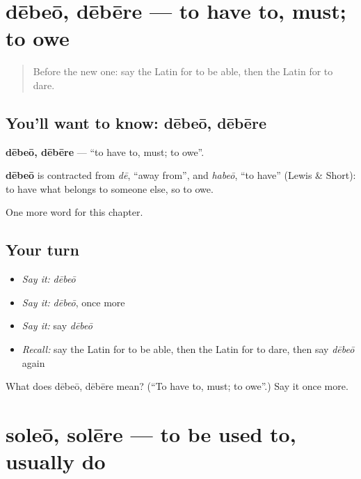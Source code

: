 \section[dēbeō, dēbēre]{dēbeō, dēbēre — to have to, must; to owe}

\label{lesson:LA-C109-debeo}



\begin{quote}
Before the new one: say the Latin for to be able, then the Latin for to dare.
\end{quote}

\subsection*{You'll want to know: dēbeō, dēbēre}
\textbf{dēbeō, dēbēre} — \textquotedblleft{}to have to, must; to owe\textquotedblright{}.

\begin{cousinweb}
\textbf{dēbeō} is contracted from \emph{dē}, \textquotedblleft{}away from\textquotedblright{}, and \emph{habeō}, \textquotedblleft{}to have\textquotedblright{} (Lewis \& Short): to have what belongs to someone else, so to owe.
\end{cousinweb}

\begin{grammarlens}[title={What you've built}]
One more word for this chapter.
\end{grammarlens}

\subsection*{Your turn}
\begin{itemize}
\raggedright
  \item \emph{Say it:} \emph{dēbeō}
  \item \emph{Say it:} \emph{dēbeō}, once more
  \item \emph{Say it:} say \emph{dēbeō}
  \item \emph{Recall:} say the Latin for to be able, then the Latin for to dare, then say \emph{dēbeō} again
\end{itemize}

\begin{tcolorbox}[breakable,colback=teal!4,colframe=teal!35!black,title={Before you move on}]
What does dēbeō, dēbēre mean? (\textquotedblleft{}To have to, must; to owe\textquotedblright{}.) Say it once more.
\end{tcolorbox}
\section[soleō, solēre]{soleō, solēre — to be used to, usually do}

